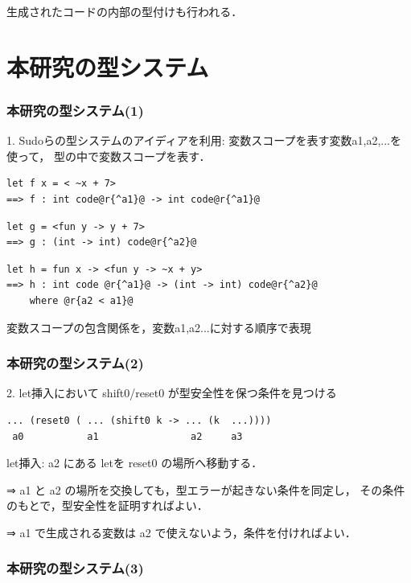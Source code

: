 \documentclass[dvipdfmx,cjk,xcolor=dvipsnames,envcountsect,notheorems,12pt,handout]{beamer} \usepackage{pgfpages} \pgfpagesuselayout{4 on 1}[a4paper,landscape,border shrink=5mm]
\theoremstyle{definition}
\begin{document}
\begin{appendix}
\begin{frame}[fragile]
  生成されたコードの内部の型付けも行われる．
\end{frame}

\section{本研究の型システム}

\begin{frame}[fragile]
  \frametitle{本研究の型システム(1)}

  1. Sudoらの型システムのアイディアを利用:
  変数スコープを表す変数a1,a2,...を使って，
  型の中で変数スコープを表す．

\begin{lstlisting}
let f x = < ~x + 7>
==> f : int code@r{^a1}@ -> int code@r{^a1}@
\end{lstlisting}
\begin{lstlisting}
let g = <fun y -> y + 7>
==> g : (int -> int) code@r{^a2}@
\end{lstlisting}
\begin{lstlisting}
let h = fun x -> <fun y -> ~x + y>
==> h : int code @r{^a1}@ -> (int -> int) code@r{^a2}@
    where @r{a2 < a1}@
\end{lstlisting}

  変数スコープの包含関係を，変数a1,a2...に対する順序で表現
\end{frame}

\begin{frame}[fragile]
  \frametitle{本研究の型システム(2)}

  2. let挿入において shift0/reset0 が型安全性を保つ条件を見つける

\begin{lstlisting}
... (reset0 ( ... (shift0 k -> ... (k  ...))))
 a0           a1                a2     a3
\end{lstlisting}

  \medskip

  let挿入: a2 にある letを reset0 の場所へ移動する．

  \medskip
  ⇒ a1 と a2 の場所を交換しても，型エラーが起きない条件を同定し，
  その条件のもとで，型安全性を証明すればよい．

  \medskip
  ⇒ a1 で生成される変数は a2 で使えないよう，条件を付ければよい．

\end{frame}

\begin{frame}[fragile]
  \frametitle{本研究の型システム(3)}


\end{frame}
\end{appendix}
\end{document}
